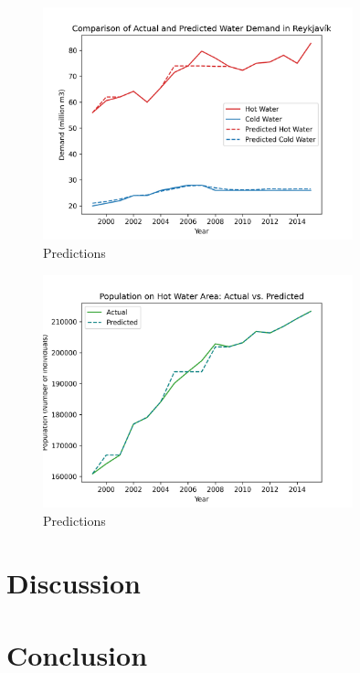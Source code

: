 \documentclass{article}
\begin{document}
\begin{figure}[h]
    \centering
    \includegraphics[width=0.8\textwidth]{../figures/comparision-of-actual-and-predicted-water-demand.png}
    \caption{Predictions}
    \label{fig:water-demand-predictions}
\end{figure}

\begin{figure}[h]
    \centering
    \includegraphics[width=0.8\textwidth]{../figures/population-hot-water-area-actual-vs-predicted.png}
    \caption{Predictions}
    \label{fig:population-wredictions}
\end{figure}

\section{Discussion}

\section{Conclusion}




\end{document}
